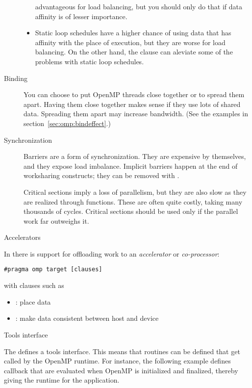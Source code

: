 \begin{description}
\begin{itemize}
    advantageous for load balancing, but you should only do that if
    data affinity is of lesser importance.
  \item Static loop schedules have a higher chance of using data that
    has affinity with the place of execution, but they are worse for
    load balancing. On the other hand, the  clause
    can aleviate some of the problems with static loop schedules.
  \end{itemize}
\item[Binding] You can choose to put OpenMP threads close together or
  to spread them apart. Having them close together makes sense if they
  use lots of shared data. Spreading them apart may increase
  bandwidth. (See the examples in section~\ref{sec:omp:bindeffect}.)
\item[Synchronization] Barriers are a form of synchronization. They
  are expensive by themselves, and they expose load
  imbalance. Implicit barriers happen at the end of worksharing
  constructs; they can be removed with .

  Critical sections imply a loss of parallelism, but they are also
  slow as they are realized through 
  functions. These are often quite costly, taking many thousands of
  cycles.  Critical sections should be used only if the parallel work
  far outweighs it.
\end{description}

 {Accelerators}

In  there is support for offloading work to an
\emph{accelerator}
or
\emph{co-processor}:
\begin{lstlisting}
#pragma omp target [clauses]
\end{lstlisting}
with clauses such as
\begin{itemize}
\item {}: place data
\item {}: make data consistent between host and device
\end{itemize}

 {Tools interface}

The  defines a tools interface.
This means that routines can be defined that get called by the OpenMP runtime.
For instance, the following example defines callback that are evaluated
when OpenMP is initialized and finalized, thereby giving the
runtime for the application.

